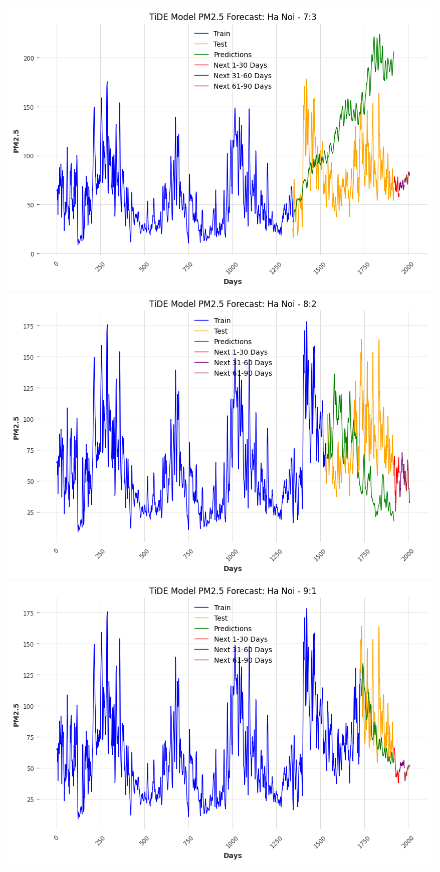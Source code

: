 \begin{figure}[H]
{\begin{adjustbox}{minipage=0.48\textwidth}
\begin{minipage}{0.3\textwidth}
            \end{minipage}\hfill
            \begin{minipage}{0.3\textwidth}
                \centering
                \includegraphics[width=\textwidth]{img/final/TiDE/90D/TiDE_7_3_HN.png}\\
                \includegraphics[width=\textwidth]{img/final/TiDE/90D/TiDE_8_2_HN.png}\\
                \includegraphics[width=\textwidth]{img/final/TiDE/90D/TiDE_9_1_HN.png}

\end{minipage}
\end{adjustbox}}
\end{figure}
